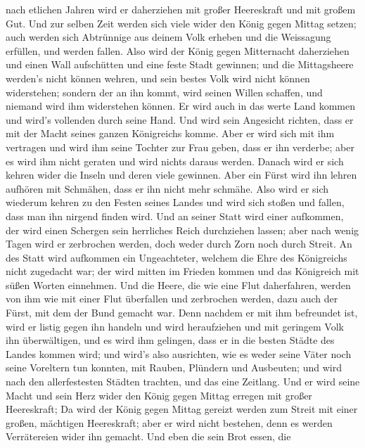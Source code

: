 nach etlichen Jahren wird er daherziehen mit großer Heereskraft und mit
großem Gut.  Und zur selben Zeit werden sich viele wider
den König gegen Mittag setzen; auch werden sich Abtrünnige aus deinem
Volk erheben und die Weissagung erfüllen, und werden fallen.
 Also wird der König gegen Mitternacht daherziehen und
einen Wall aufschütten und eine feste Stadt gewinnen; und die
Mittagsheere werden's nicht können wehren, und sein bestes Volk wird
nicht können widerstehen;  sondern der an ihn kommt, wird
seinen Willen schaffen, und niemand wird ihm widerstehen können. Er wird
auch in das werte Land kommen und wird's vollenden durch seine Hand.
 Und wird sein Angesicht richten, dass er mit der Macht
seines ganzen Königreichs komme. Aber er wird sich mit ihm vertragen und
wird ihm seine Tochter zur Frau geben, dass er ihn verderbe; aber es
wird ihm nicht geraten und wird nichts daraus werden. 
Danach wird er sich kehren wider die Inseln und deren viele gewinnen.
Aber ein Fürst wird ihn lehren aufhören mit Schmähen, dass er ihn nicht
mehr schmähe.  Also wird er sich wiederum kehren zu den
Festen seines Landes und wird sich stoßen und fallen, dass man ihn
nirgend finden wird.  Und an seiner Statt wird einer
aufkommen, der wird einen Schergen sein herrliches Reich durchziehen
lassen; aber nach wenig Tagen wird er zerbrochen werden, doch weder
durch Zorn noch durch Streit.  An des Statt wird
aufkommen ein Ungeachteter, welchem die Ehre des Königreichs nicht
zugedacht war; der wird mitten im Frieden kommen und das Königreich mit
süßen Worten einnehmen.  Und die Heere, die wie eine Flut
daherfahren, werden von ihm wie mit einer Flut überfallen und zerbrochen
werden, dazu auch der Fürst, mit dem der Bund gemacht war.
 Denn nachdem er mit ihm befreundet ist, wird er listig
gegen ihn handeln und wird heraufziehen und mit geringem Volk ihn
überwältigen,  und es wird ihm gelingen, dass er in die
besten Städte des Landes kommen wird; und wird's also ausrichten, wie es
weder seine Väter noch seine Voreltern tun konnten, mit Rauben, Plündern
und Ausbeuten; und wird nach den allerfestesten Städten trachten, und
das eine Zeitlang.  Und er wird seine Macht und sein Herz
wider den König gegen Mittag erregen mit großer Heereskraft; Da wird der
König gegen Mittag gereizt werden zum Streit mit einer großen, mächtigen
Heereskraft; aber er wird nicht bestehen, denn es werden Verrätereien
wider ihn gemacht.  Und eben die sein Brot essen, die
